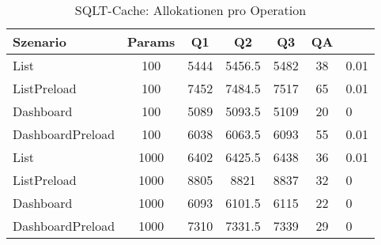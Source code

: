 \begin{table}[ht]
\centering
\caption{SQLT-Cache: Allokationen pro Operation}
\begin{tabular}{lccccc}
\toprule
Szenario & Params & Q1 & Q2 & Q3 & QA \\
\midrule
	List & 100 & 5444 & 5456.5 & 5482 & 38 & 0.01 \\
	ListPreload & 100 & 7452 & 7484.5 & 7517 & 65 & 0.01 \\
	Dashboard & 100 & 5089 & 5093.5 & 5109 & 20 & 0 \\
	DashboardPreload & 100 & 6038 & 6063.5 & 6093 & 55 & 0.01 \\
	List & 1000 & 6402 & 6425.5 & 6438 & 36 & 0.01 \\
	ListPreload & 1000 & 8805 & 8821 & 8837 & 32 & 0 \\
	Dashboard & 1000 & 6093 & 6101.5 & 6115 & 22 & 0 \\
	DashboardPreload & 1000 & 7310 & 7331.5 & 7339 & 29 & 0 \\
\bottomrule
\end{tabular}
\label{tab:benchmark_sqlt-cache_allocsperop}
\end{table}
	